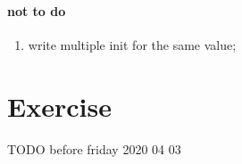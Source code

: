 \documentclass[11pt]{article}
\begin{document}
\paragraph{not to do} %
\label{par:not_to_do}
\begin{enumerate}
	\item write multiple init for the same value;
\end{enumerate}




\section{Exercise} %
\label{sec:exercise}
TODO before friday 2020 04 03
\end{document}
